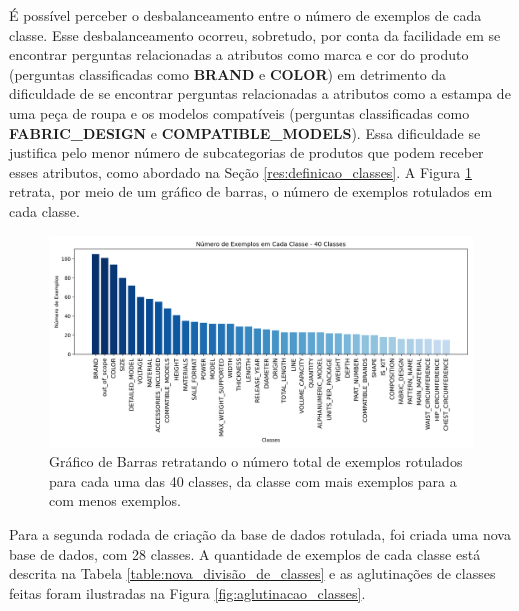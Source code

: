 É possível perceber o desbalanceamento entre o número de exemplos de cada classe. Esse desbalanceamento ocorreu, sobretudo, por conta da facilidade em se encontrar perguntas relacionadas a atributos como marca e cor do produto (perguntas classificadas como \textbf{BRAND} e \textbf{COLOR}) em detrimento da dificuldade de se encontrar perguntas relacionadas a atributos como a estampa de uma peça de roupa e os modelos compatíveis (perguntas classificadas como \textbf{FABRIC\_DESIGN} e \textbf{COMPATIBLE\_MODELS}). Essa dificuldade se justifica pelo menor número de subcategorias de produtos que podem receber esses atributos, como abordado na Seção \ref{res:definicao_classes}. A Figura \ref{fig:número_de_exemplos_40_classes} retrata, por meio de um gráfico de barras, o número de exemplos rotulados em cada classe.

\begin{figure}[!htb]
    \centering
	\includegraphics[width=1\linewidth]{figuras/número_de_exemplos_40_classes.png}
	\caption{Gráfico de Barras retratando o número total de exemplos rotulados para cada uma das 40 classes, da classe com mais exemplos para a com menos exemplos.}
	\label{fig:número_de_exemplos_40_classes}
\end{figure}

Para a segunda rodada de criação da base de dados rotulada, foi criada uma nova base de dados, com 28 classes. A quantidade de exemplos de cada classe está descrita na Tabela \ref{table:nova_divisão_de_classes} e as aglutinações de classes feitas foram ilustradas na Figura \ref{fig:aglutinacao_classes}. 

